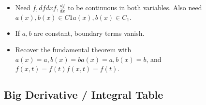\begin{itemize}
\tightlist
\item
  Need \(f,dfdxf, \frac{df}{dx}\) to be continuous in both variables.
  Also need \(a(x),b(x)∈C1a(x),b(x) \in C_1\).
\item
  If \(a,b\) are constant, boundary terms vanish.
\item
  Recover the fundamental theorem with
  \(a(x)=a,b(x)=ba(x) = a, b(x) = b\), and \(f(x,t)=f(t)f(x,t) = f(t)\).
\end{itemize}

\hypertarget{big-derivative-integral-table}{%
\subsection{Big Derivative / Integral
Table}\label{big-derivative-integral-table}}

